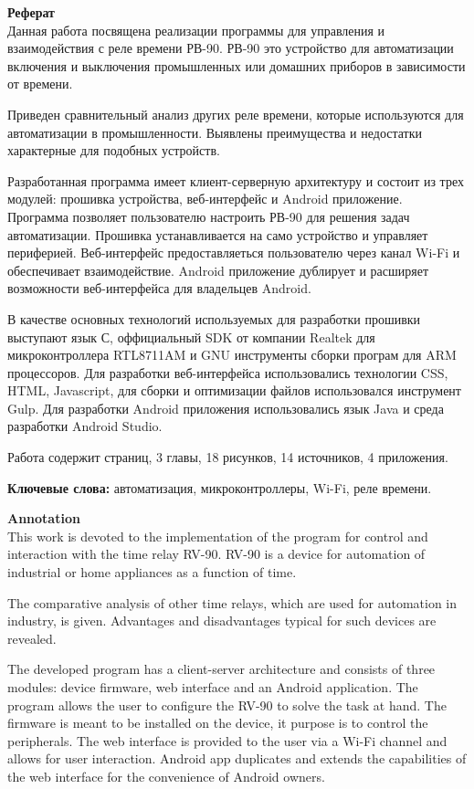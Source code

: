 \textbf{\Large Реферат} \\

Данная работа посвящена реализации программы для управления и взаимодействия с реле времени РВ-90. РВ-90 это устройство для автоматизации включения и выключения промышленных или домашних приборов в зависимости от времени.

Приведен сравнительный анализ других реле времени, которые используются для автоматизации в промышленности. Выявлены преимущества и недостатки характерные для подобных устройств.

Разработанная программа имеет клиент-серверную архитектуру и состоит из трех модулей: прошивка устройства, веб-интерфейс и Android приложение. Программа позволяет пользователю настроить РВ-90 для решения задач автоматизации. Прошивка устанавливается на само устройство и управляет периферией. Веб-интерфейс предоставляеться пользователю через канал Wi-Fi и обеспечивает взаимодействие. Android приложение дублирует и расширяет возможности веб-интерфейса для владельцев Android.

В качестве основных технологий используемых для разработки прошивки выступают язык С, оффициальный SDK от компании Realtek для микроконтроллера RTL8711AM и GNU инструменты сборки програм для ARM процессоров. Для разработки веб-интерфейса использовались технологии CSS, HTML, Javascript, для сборки и оптимизации файлов использовался инструмент Gulp. Для разработки Android приложения использовались язык Java и среда разработки Android Studio.

Работа содержит \pageref{LastPage} страниц, 3 главы, 18 рисунков, 14 источников, 4 приложения.

\textbf{Ключевые слова:} автоматизация,  микроконтроллеры, Wi-Fi, реле времени.

\newpage

\textbf{\Large Annotation} \\

This work is devoted to the implementation of the program for control and interaction with the time relay RV-90. RV-90 is a device for automation of industrial or home appliances as a function of time.

The comparative analysis of other time relays, which are used for automation in industry, is given. Advantages and disadvantages typical for such devices are revealed.

The developed program has a client-server architecture and consists of three modules: device firmware, web interface and an Android application. The program allows the user to configure the RV-90 to solve the task at hand. The firmware is meant to be installed on the device, it purpose is to control the peripherals. The web interface is provided to the user via a Wi-Fi channel and allows for user interaction. Android app duplicates and extends the capabilities of the web interface for the convenience of Android owners.

